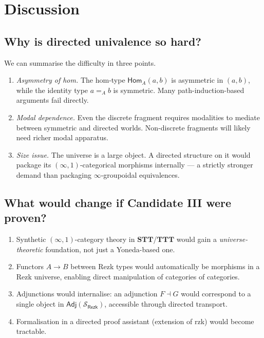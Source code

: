 \documentclass[12pt]{article}
\theoremstyle{definition}
\theoremstyle{remark}
\newcommand{\Hom}{\mathsf{Hom}}
\newcommand{\STT}{\mathbf{STT}}
\newcommand{\TTT}{\mathbf{TTT}}
\begin{document}
\section{Discussion}\label{sec:discussion}

\subsection{Why is directed univalence so hard?}

We can summarise the difficulty in three points.

\begin{enumerate}
\item \emph{Asymmetry of hom.} The hom-type $\Hom_A(a,b)$ is asymmetric in $(a,b)$, while the identity type $a =_A b$ is symmetric. Many path-induction-based arguments fail directly.
\item \emph{Modal dependence.} Even the discrete fragment requires modalities to mediate between symmetric and directed worlds. Non-discrete fragments will likely need richer modal apparatus.
\item \emph{Size issue.} The universe is a large object. A directed structure on it would package its $(\infty,1)$-categorical morphisms internally --- a strictly stronger demand than packaging $\infty$-groupoidal equivalences.
\end{enumerate}

\subsection{What would change if Candidate III were proven?}

\begin{enumerate}
\item Synthetic $(\infty,1)$-category theory in $\STT$/$\TTT$ would gain a \emph{universe-theoretic} foundation, not just a Yoneda-based one.
\item Functors $A \to B$ between Rezk types would automatically be morphisms in a Rezk universe, enabling direct manipulation of categories of categories.
\item Adjunctions would internalise: an adjunction $F \dashv G$ would correspond to a single object in $\mathsf{Adj}(\mathcal{S}_{\mathsf{Rezk}})$, accessible through directed transport.
\item Formalisation in a directed proof assistant (extension of rzk) would become tractable.
\end{enumerate}
\end{document}
